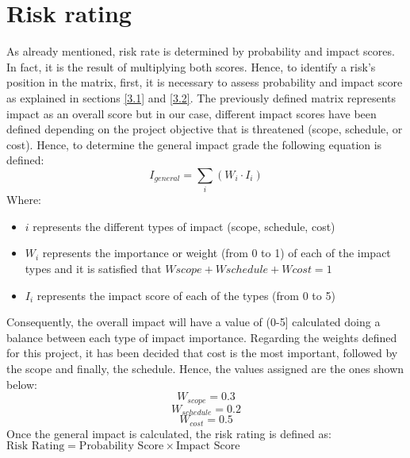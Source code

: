 \section{Risk rating}
As already mentioned, risk rate is determined by probability and impact scores. In fact, it is the result of multiplying both scores. Hence, to identify a risk’s position in the matrix, first, it is necessary to assess probability and impact score as explained in sections \ref{3.1} and \ref{3.2}.
The previously defined matrix represents impact as an overall score but in our case, different impact scores have been defined depending on the project objective that is threatened (scope, schedule, or cost). Hence, to determine the general impact grade the following equation is defined:
\begin{equation}
I_{general}=\sum_{i}(W_i\cdot I_i)
\end{equation}
Where:
\begin{itemize}
	\item $i$ represents the different types of impact (scope, schedule, cost)
	\item $W_i$ represents the importance or weight (from 0 to 1) of each of the impact types and it is satisfied that $Wscope + Wschedule + Wcost = 1$
	\item $I_i$ represents the impact score of each of the types (from 0 to 5)
\end{itemize}

Consequently, the overall impact will have a value of (0-5] calculated doing a balance between each type of impact importance.
Regarding the weights defined for this project, it has been decided that cost is the most important, followed by the scope and finally, the schedule. Hence, the values assigned are the ones shown  below:
	$$W_{scope}=0.3$$
	$$W_{schedule}=0.2$$
	$$W_{cost}=0.5$$
Once the general impact is calculated, the risk rating is defined as:
$\text{Risk Rating}=\text{Probability Score}\times \text{Impact Score}$

